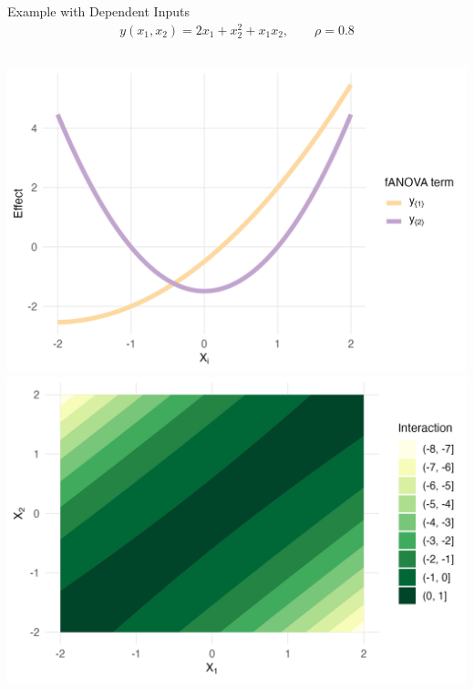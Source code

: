 \begin{frame}{Example with Dependent Inputs} %
    \begin{align*}
    y(x_1, x_2) = 2x_1 + x_2^{2} + x_1 x_2, \qquad \rho = 0.8
  \end{align*}
  \begin{columns}
      \includegraphics[width=\linewidth]{../images/experiment_section/gen_ex_1_a1p20_a2p00_a11p00_a22p10_a12p10_rhop08_main.png}
      \includegraphics[width=\linewidth]{../images/experiment_section/gen_ex_1_a1p20_a2p00_a11p00_a22p10_a12p10_rhop08_interaction.png}
  \end{columns}
\end{frame}

